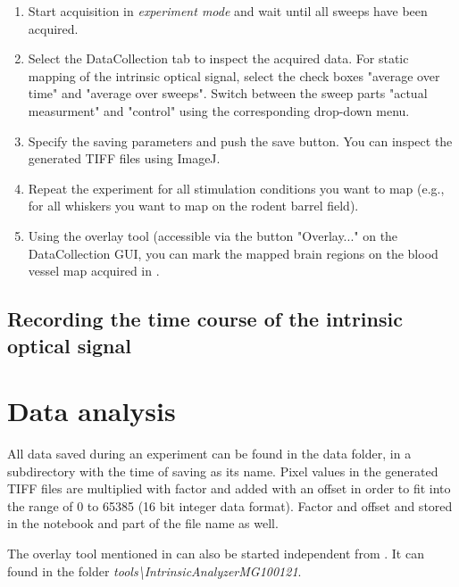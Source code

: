 \begin{enumerate}
	\item Start acquisition in \textit{experiment mode} and wait until all sweeps have been acquired.
	\item Select the DataCollection tab to inspect the acquired data. For static mapping of the intrinsic optical signal, select the check boxes "average over time" and "average over sweeps". Switch between the sweep parts "actual measurment" and "control" using the corresponding drop-down menu.
	\item Specify the saving parameters and push the save button. You can inspect the generated \ac{TIFF} files using ImageJ.
	\item Repeat the experiment for all stimulation conditions you want to map (e.g., for all whiskers you want to map on the rodent barrel field). 
	\item Using the overlay tool (accessible via the button "Overlay..." on the DataCollection \ac{GUI}, you can mark the mapped brain regions on the blood
vessel map acquired in .
\end{enumerate}

\subsection{Recording the time course of the intrinsic optical signal}

\section{Data analysis}
All data saved during an experiment can be found in the \HS data folder, in a subdirectory with the time of saving as its name. Pixel values in the generated \ac{TIFF} files are multiplied with factor and added with an offset in order to fit into the range of 0 to 65385 (16 bit integer data format). Factor and offset and stored in the notebook and part of the file name as well.

The overlay tool mentioned in  can also be started independent from \HS. It can found in the folder \textit{tools\textbackslash IntrinsicAnalyzerMG100121}.
	